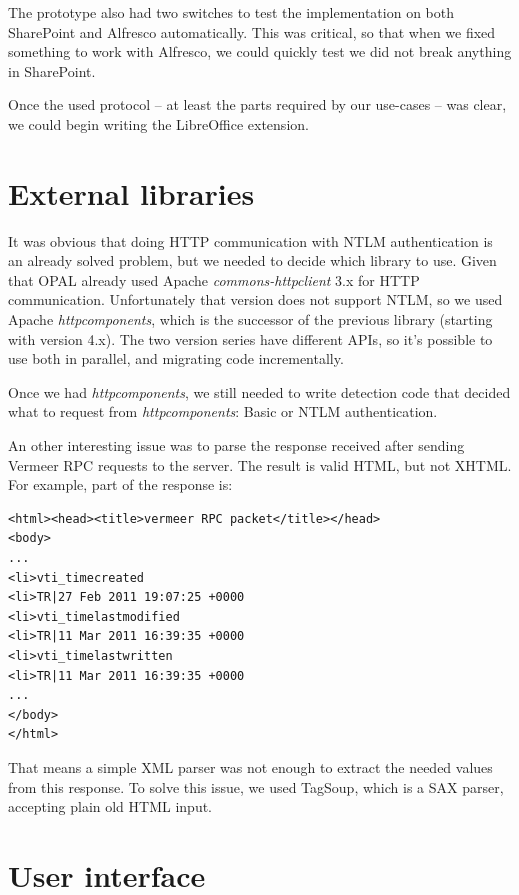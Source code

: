The prototype also had two switches to test the implementation on both
SharePoint and Alfresco automatically. This was critical, so that when we fixed
something to work with Alfresco, we could quickly test we did not break
anything in SharePoint.

Once the used protocol -- at least the parts required by our use-cases -- was
clear, we could begin writing the LibreOffice extension.

\section{External libraries}

It was obvious that doing HTTP communication with NTLM authentication is an
already solved problem, but we needed to decide which library to use. Given that
OPAL already used Apache \emph{commons-httpclient}\cite{httpclient} 3.x for
HTTP communication. Unfortunately that version does not support NTLM, so we used
Apache \emph{httpcomponents}\cite{httpcomponents}, which is the successor of
the previous library (starting with version 4.x). The two version series have
different APIs, so it's possible to use both in parallel, and migrating code
incrementally.

Once we had \emph{httpcomponents}, we still needed to write detection code that
decided what to request from \emph{httpcomponents}: Basic or NTLM
authentication.

An other interesting issue was to parse the response received after sending
Vermeer RPC requests to the server. The result is valid HTML, but not XHTML.
For example, part of the response is:

\begin{lstlisting}
<html><head><title>vermeer RPC packet</title></head>
<body>
...
<li>vti_timecreated
<li>TR|27 Feb 2011 19:07:25 +0000
<li>vti_timelastmodified
<li>TR|11 Mar 2011 16:39:35 +0000
<li>vti_timelastwritten
<li>TR|11 Mar 2011 16:39:35 +0000
...
</body>
</html>\end{lstlisting}

That means a simple XML parser was not enough to extract the needed values from
this response. To solve this issue, we used TagSoup\cite{tagsoup}, which is a
SAX parser, accepting plain old HTML input.

\section{User interface}


